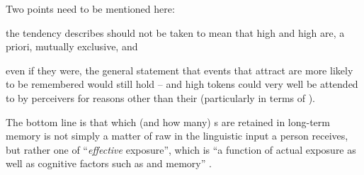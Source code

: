 Two points need to be mentioned here:
\begin{inparaenum}[(1)]
	\item the tendency \citeauthor{pierrehumbert2006} describes should not be taken to mean that high  and high  are, a priori, mutually exclusive, and
	\item even if they were, the general statement that events that attract  are more likely to be remembered would still hold -- and high  tokens could very well be attended to by perceivers for reasons other than their  (particularly in terms of ).
\end{inparaenum}
The bottom line is that which (and how many) s are retained in long-term memory is not simply a matter of raw  in the linguistic input a person receives, but rather one of ``\emph{effective} exposure'', which is ``a function of actual exposure as well as cognitive factors such as  and memory'' \parencite[519, my emphasis]{pierrehumbert2006}.

